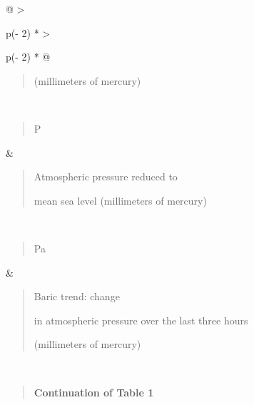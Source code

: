 \begin{longtable}[]{@{}
  >{\raggedright\arraybackslash}p{(\columnwidth - 2\tabcolsep) * }
  >{\raggedright\arraybackslash}p{(\columnwidth - 2\tabcolsep) * }@{}}
\begin{minipage}[t]{\linewidth}
\begin{quote}
(millimeters of mercury)
\end{quote}
\end{minipage} \\
\begin{minipage}[t]{\linewidth}\raggedright
\begin{quote}
P
\end{quote}
\end{minipage} & \begin{minipage}[t]{\linewidth}\raggedright
\begin{quote}
Atmospheric pressure reduced to

mean sea level (millimeters of mercury)
\end{quote}
\end{minipage} \\
\begin{minipage}[t]{\linewidth}\raggedright
\begin{quote}
Pa
\end{quote}
\end{minipage} & \begin{minipage}[t]{\linewidth}\raggedright
\begin{quote}
Baric trend: change

in atmospheric pressure over the last three hours

(millimeters of mercury)
\end{quote}
\end{minipage} \\
\end{longtable}

\begin{quote}
{\bfseries Continuation of Table 1}
\end{quote}

